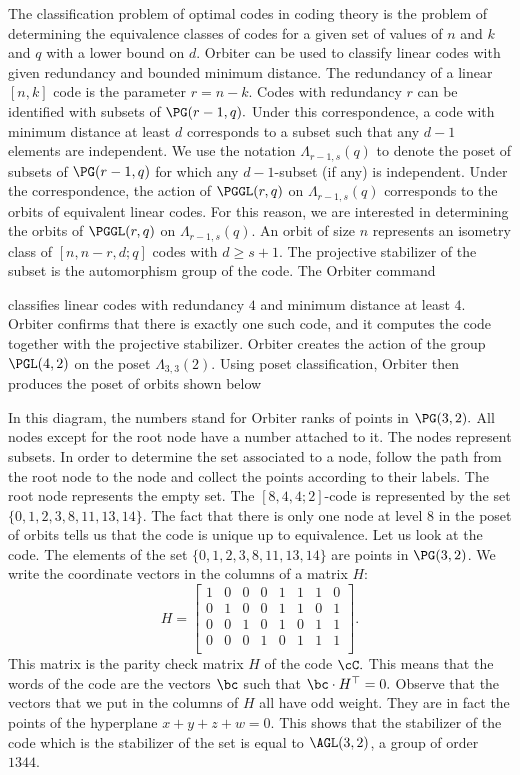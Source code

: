 The classification problem of optimal codes 
in coding theory is the problem of determining the 
equivalence classes of codes for a given set of values 
of $n$ and $k$ and $q$ with a lower bound on $d.$ 
Orbiter can be used to classify linear codes with given redundancy and bounded minimum distance. 
The redundancy of a linear $[n,k]$ code is the parameter $r = n - k.$
Codes with redundancy $r$ can be identified with subsets of $\PG(r-1,q).$
Under this correspondence, 
a code with minimum distance at least $d$ 
corresponds to a subset such that any $d-1$ elements are independent.
We use the notation  $\Lambda_{r-1,s}(q)$ to denote the poset of 
subsets of $\PG(r-1,q)$ for which any $d-1$-subset (if any) is independent. 
Under the correspondence, 
the action of $\PGGL(r,q)$ on $\Lambda_{r-1,s}(q)$ corresponds to the orbits of equivalent linear codes.
For this reason, we are interested in determining the orbits of $\PGGL(r,q)$ on $\Lambda_{r-1,s}(q).$ 
An orbit of size $n$ represents an isometry class of  $[n,n-r,d;q]$ codes with $d \ge s +1.$
The projective stabilizer of the subset is the automorphism group of the code.
The Orbiter command 


classifies linear codes with redundancy $4$ and minimum distance at least $4$. 
Orbiter confirms that there is exactly one such code, and it 
computes the code together with the projective stabilizer.
Orbiter creates the action of 
the group $\PGL(4,2)$ on the poset $\Lambda_{3,3}(2).$ 
Using poset classification, Orbiter then produces the 
poset of orbits shown below

In this diagram, the numbers stand for Orbiter ranks of points in $\PG(3,2).$ 
All nodes except for the root node have a number attached to it.
The nodes represent subsets. In order to determine the set associated to a node, 
follow the path from the root node to the node and collect the points according to their labels. 
The root node represents the empty set.
The $[8,4,4;2]$-code is represented by the set $\{0,1,2,3,8,11,13,14\}.$
The fact that there is only one node at level $8$ 
in the poset of orbits tells us that the code is unique up to equivalence.
Let us look at the code. The elements of the set $\{0,1,2,3,8,11,13,14\}$
are points in $\PG(3,2)$. 
We write the coordinate vectors in the columns of a matrix $H$:
$$
H=\left[
\begin{array}{cccccccc}
1&0&0&0&1&1&1&0\\
0&1&0&0&1&1&0&1\\
0&0&1&0&1&0&1&1\\
0&0&0&1&0&1&1&1\\
\end{array}
\right].
$$
This matrix is the parity check matrix $H$ of the code $\cC.$
This means that the words of the code are the vectors $\bc$ such that $\bc\cdot H^\top = 0.$
Observe that the vectors that we put in the columns of $H$ all have odd weight. 
They are in fact the points of the hyperplane $x+y+z+w = 0.$ 
This shows that the stabilizer of the code which is the stabilizer of the set is 
equal to $\AGL(3,2)$, a group of order $1344.$

\bigskip
